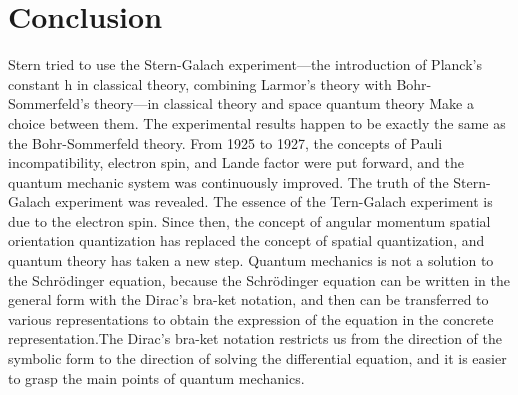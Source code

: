 \documentclass[a4paper]{article}
\begin{document}
\section{Conclusion}
    Stern tried to use the Stern-Galach experiment—the introduction of Planck's constant h in classical theory, combining Larmor's theory with Bohr-Sommerfeld's theory—in classical theory and space quantum theory Make a choice between them. The experimental results happen to be exactly the same as the Bohr-Sommerfeld theory. From 1925 to 1927, the concepts of Pauli incompatibility, electron spin, and Lande factor were put forward, and the quantum mechanic system was continuously improved. The truth of the Stern-Galach experiment was revealed. The essence of the Tern-Galach experiment is due to the electron spin. Since then, the concept of angular momentum spatial orientation quantization has replaced the concept of spatial quantization, and quantum theory has taken a new step.
    Quantum mechanics is not a solution to the Schrödinger equation, because the Schrödinger equation can be written in the general form with the Dirac's bra-ket notation, and then can be transferred to various representations to obtain the expression of the equation in the concrete representation.The Dirac's bra-ket notation restricts us from the direction of the symbolic form to the direction of solving the differential equation, and it is easier to grasp the main points of quantum mechanics.




\end{document}
